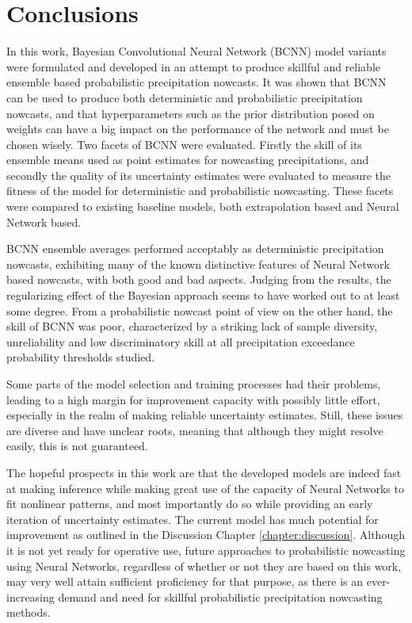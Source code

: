 \chapter{Conclusions}
\label{chapter:conclusions}


In this work, Bayesian Convolutional Neural Network (BCNN) model variants were formulated and developed in an attempt to produce skillful and reliable ensemble based probabilistic precipitation nowcasts. It was shown that BCNN can be used to produce both deterministic and probabilistic precipitation nowcasts, and that hyperparameters such as the prior distribution posed on weights can have a big impact on the performance of the network and must be chosen wisely. Two facets of BCNN were evaluated. Firstly the skill of its ensemble means used as point estimates for nowcasting precipitations, and secondly the quality of its uncertainty estimates were evaluated to measure the fitness of the model for deterministic and probabilistic nowcasting. These facets were compared to existing baseline models, both extrapolation based and Neural Network based. 

BCNN ensemble averages performed acceptably as deterministic precipitation nowcasts, exhibiting many of the known distinctive features of Neural Network based nowcasts, with both good and bad aspects. Judging from the results, the regularizing effect of the Bayesian approach seems to have worked out to at least some degree. From a probabilistic nowcast point of view on the other hand, the skill of BCNN was poor, characterized by a striking lack of sample diversity, unreliability and low discriminatory skill at all precipitation exceedance probability thresholds studied.

Some parts of the model selection and training processes had their problems, leading to a high margin for improvement capacity with possibly little effort, especially in the realm of making reliable uncertainty estimates. Still, these issues are diverse and have unclear roots, meaning that although they might resolve easily, this is not guaranteed. 

The hopeful prospects in this work are that the developed models are indeed fast at making inference while making great use of the capacity of Neural Networks to fit nonlinear patterns, and most importantly do so while providing an early iteration of uncertainty estimates. The current model has much potential for improvement as outlined in the Discussion Chapter \ref{chapter:discussion}. Although it is not yet ready for operative use, future approaches to probabilistic nowcasting using Neural Networks, regardless of whether or not they are based on this work, may very well attain sufficient proficiency for that purpose, as there is an ever-increasing demand and need for skillful probabilistic precipitation nowcasting methods.